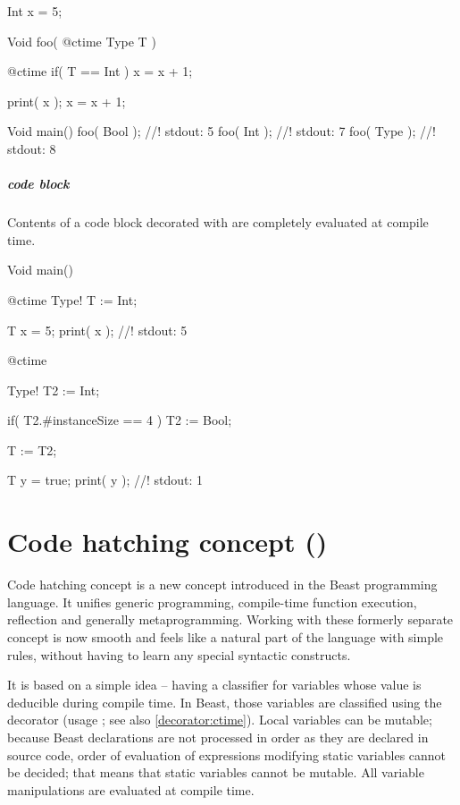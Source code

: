 \begin{code}
Int x = 5;

Void foo( @ctime Type T ) {	
	@ctime if( T == Int )
		x = x + 1;
	
	print( x );
	x = x + 1;
}

Void main() {
	foo( Bool ); //! stdout: 5
	foo( Int ); //! stdout: 7
	foo( Type ); //! stdout: 8
}
\end{code}

\paragraph{\ctime code block} Contents of a code block decorated with \ctime are completely evaluated at compile time. \nopagebreak

\begin{code}
Void main() {
	@ctime Type! T := Int;
	
	T x = 5;
	print( x ); //! stdout: 5
	
	@ctime {
		Type! T2 := Int;
		
		if( T2.#instanceSize == 4 )
			T2 := Bool;
		
		T := T2;
	}
	
	T y = true;
	print( y ); //! stdout: 1
}
\end{code}

\chapter{Code hatching concept ()} \label{ctime}
Code hatching concept is a new concept introduced in the Beast programming language. It unifies generic programming, compile-time function execution, reflection and generally metaprogramming. Working with these formerly separate concept is now smooth and feels like a natural part of the language with simple rules, without having to learn any special syntactic constructs.

It is based on a simple idea -- having a classifier for variables whose value is deducible during compile time. In Beast, those variables are classified using the  decorator (usage ; see also \autoref{decorator:ctime}). Local \ctime variables can be mutable; because Beast declarations are not processed in order as they are declared in source code, order of evaluation of expressions modifying static \ctime variables cannot be decided; that means that static \ctime variables cannot be mutable. All \ctime variable manipulations are evaluated at compile time.


